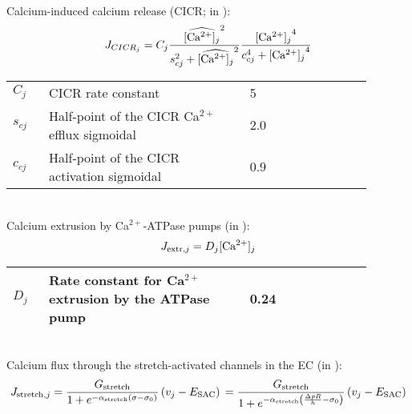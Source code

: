 \\
%
Calcium-induced calcium release (CICR; in \uMs):
\begin{equation} \label{eq:JCICRJ}
J_{CICR_{j}} = C_{j}\frac{\widehat{\text{[Ca$^{2+}$]$_j$}}^{2}}{s_{cj}^{2}+\widehat{\text{[Ca$^{2+}$]$_j$}}^{2}}    \frac{\text{[Ca$^{2+}$]$_j$}^{4}}{c_{cj}^{4}+\text{[Ca$^{2+}$]$_j$}^{4}}
\end{equation}
%
\begin{table}[h!]
\centering
\begin{tabular}{ p{0.09\linewidth}  >{\footnotesize} p{0.5\linewidth}  >{\footnotesize} p{0.27\linewidth} >{\footnotesize} p{0.03\linewidth} }
\hline
$C_{j}$      			& CICR rate constant									& 5 \uMs		& \cite{Koenigsberger2006} \\
$s_{cj}$				& Half-point of the CICR Ca$^{2+}$ efflux sigmoidal			& 2.0 \uM		& \cite{Koenigsberger2006} \\
$c_{cj}$				& Half-point of the CICR activation sigmoidal			& 0.9 \uM		& \cite{Koenigsberger2006} \\
\hline
\end{tabular}
\label{tab:JCICRj}
\end{table}
\\
Calcium extrusion by Ca$^{2+}$-ATPase pumps (in \uMs):
\begin{equation} \label{eq:Jextrusionj}
J_{\text{extr},j} = D_{j}\text{[Ca$^{2+}$]$_j$} 
\end{equation}
%
%
\begin{table}[h!]
\centering
\begin{tabular}{ p{0.09\linewidth}  >{\footnotesize} p{0.5\linewidth}  >{\footnotesize} p{0.27\linewidth} >{\footnotesize} p{0.03\linewidth} }
\hline
$D_{j}$      			& Rate constant for Ca$^{2+}$ extrusion by the ATPase pump		 & 0.24	\pers			& \cite{Koenigsberger2005} \\
\hline
\end{tabular}
\label{tab:Jextrusionj}
\end{table}
\\ 
Calcium flux through the stretch-activated channels in the EC (in \uMs): 
\begin{equation} \label{eq:Jstretchj}
J_{\text{stretch},j}= \frac{G_{\text{stretch}}}{1+ e^{-\alpha_{\text{stretch}}  \left(  \sigma -\sigma_{0}   \right) }}  \left(  v_{j}-E_{\text{SAC}}   \right) \\
= \frac{G_{\text{stretch}}}{1+ e^{-\alpha_{\text{stretch}}  \left(  \frac{\Delta pR}{h} -\sigma_{0}   \right) }}  \left(  v_{j}-E_{\text{SAC}}   \right) 
\end{equation}
%
